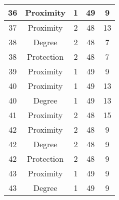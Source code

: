 \documentclass[results.tex]{subfiles}
\begin{document}
\begin{center}
\begin{tabular}{| c || c | c | c | c |}
            \hline
            36                      & Proximity                    & 1                      & 49                      & 9                    \\
            \hline
            37                      & Proximity                    & 2                      & 48                      & 13                   \\
            \hline
            38                      & Degree                       & 2                      & 48                      & 7                    \\
            \hline
            38                      & Protection                   & 2                      & 48                      & 7                    \\
            \hline
            39                      & Proximity                    & 1                      & 49                      & 9                    \\
            \hline
            40                      & Proximity                    & 1                      & 49                      & 13                   \\
            \hline
            40                      & Degree                       & 1                      & 49                      & 13                   \\
            \hline
            41                      & Proximity                    & 2                      & 48                      & 15                   \\
            \hline
            42                      & Proximity                    & 2                      & 48                      & 9                    \\
            \hline
            42                      & Degree                       & 2                      & 48                      & 9                    \\
            \hline
            42                      & Protection                   & 2                      & 48                      & 9                    \\
            \hline
            43                      & Proximity                    & 1                      & 49                      & 9                    \\
            \hline
            43                      & Degree                       & 1                      & 49                      & 9                    \\

\end{tabular}
\end{center}
\end{document}
